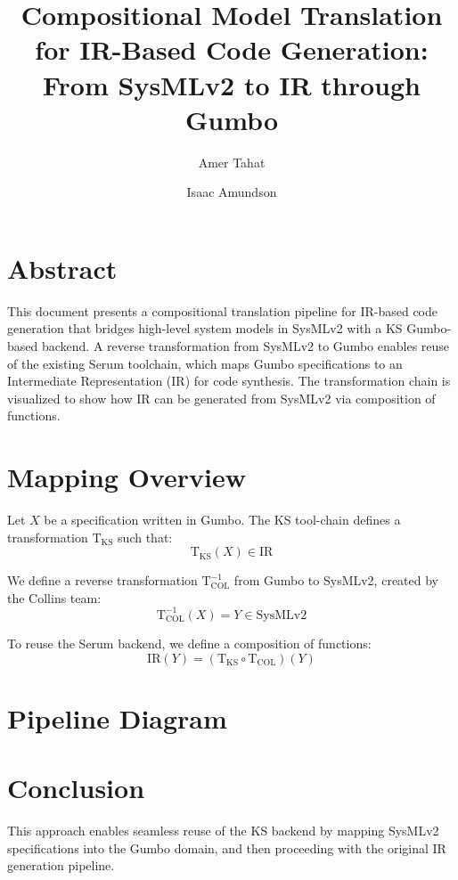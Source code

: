 \documentclass{article}
\title{%
Compositional Model Translation for IR-Based Code Generation: From SysMLv2 to IR through Gumbo}
\author{Amer Tahat \and Isaac Amundson}
\date{}
\begin{document}
\maketitle

\section*{Abstract}
This document presents a compositional translation pipeline for IR-based code generation that bridges high-level system models in SysMLv2 with a KS Gumbo-based backend. A reverse transformation from SysMLv2 to Gumbo enables reuse of the existing Serum toolchain, which maps Gumbo specifications to an Intermediate Representation (IR) for code synthesis. The transformation chain is visualized to show how IR can be generated from SysMLv2 via composition of functions.

\section*{Mapping Overview}
Let $X$ be a specification written in Gumbo. The KS tool-chain defines a transformation $\mathrm{T}_{\mathrm{KS}}$ such that:
\begin{equation*}
    \mathrm{T}_{\mathrm{KS}}(X) \in \text{IR}
\end{equation*}

We define a reverse transformation $\mathrm{T}^{-1}_{\mathrm{COL}}$ from Gumbo to SysMLv2, created by the Collins team:
\begin{equation*}
    \mathrm{T}^{-1}_{\mathrm{COL}}(X) = Y \in \text{SysMLv2}
\end{equation*}

To reuse the Serum backend, we define a composition of functions:
\begin{equation*}
    \text{IR}(Y) = \left( \mathrm{T}_{\mathrm{KS}} \circ \mathrm{T}_{\mathrm{COL}} \right)(Y)
\end{equation*}

\section*{Pipeline Diagram}

\begin{center}
\end{center}

\section*{Conclusion}
This approach enables seamless reuse of the KS backend by mapping SysMLv2 specifications into the Gumbo domain, and then proceeding with the original IR generation pipeline.
\end{document}
